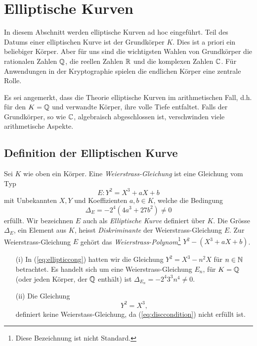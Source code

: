 \chapter{Elliptische Kurven}
\label{kap:ek}

In diesem Abschnitt werden elliptische Kurven ad hoc eingeführt.
Teil des Datums einer elliptischen Kurve ist der Grundkörper $K$. Dies
ist a priori ein beliebiger Körper. Aber für uns sind die wichtigsten
Wahlen von Grundkörper die rationalen Zahlen ${\mathbb{Q}}$, die reellen Zahlen
${\mathbb{R}}$ und die komplexen Zahlen ${\mathbb{C}}$. Für Anwendungen in der
Kryptographie spielen  die endlichen Körper eine zentrale Rolle.

Es sei angemerkt, dass die Theorie elliptische Kurven im
arithmetischen Fall, d.h. für den $K={\mathbb{Q}}$ und verwandte Körper, ihre
volle Tiefe entfaltet. Falls der Grundkörper, so wie ${\mathbb{C}}$,
algebraisch abgeschlossen ist, verschwinden viele arithmetische
Aspekte.

\section{Definition der Elliptischen Kurve}

\begin{definition}
  Sei $K$ wie oben ein Körper.
  Eine \emph{Weierstrass-Gleichung} ist eine Gleichung vom Typ
  \begin{equation}
    \label{eq:weierstrass}
    E: Y^2 = X^3 + aX + b
  \end{equation}
  mit Unbekannten $X,Y$ und Koeffizienten $a,b\in K$, welche die
  Bedingung
  \begin{equation}
    \label{eq:disccondition}
    \Delta_E = -2^4(4a^3+27b^2)\not=0
  \end{equation}
  erfüllt. Wir bezeichnen $E$ auch als \emph{Elliptische
    Kurve}
  definiert über $K$.
  Die Grösse $\Delta_E$, ein Element aus $K$, heisst
  \emph{Diskriminante}
  der Weierstrass-Gleichung $E$. Zur Weierstrass-Gleichung $E$ gehört
  das \emph{Weierstrass-Polynom}\footnote{Diese Bezeichnung ist nicht
    Standard.} $Y^2- (X^3+aX+b)$.
\end{definition}

\begin{beispiele}\leavevmode
  \begin{enumerate}
  \item [(i)] In (\ref{eq:ellipticcong}) hatten wir die Gleichung $Y^2 = X^3-n^2X$
    für $n\in{\mathbb{N}}$ betrachtet. Es handelt sich um eine
    Weierstrass-Gleichung $E_n$, für $K={\mathbb{Q}}$ (oder jeden Körper, der ${\mathbb{Q}}$
    enthält) ist $\Delta_{E_n} = -2^4 3^3 n^4 \not=0$.
  \item[(ii)] Die Gleichung
    \begin{equation*}
      Y^2 = X^3,
    \end{equation*}
    definiert keine Weierstass-Gleichung, da (\ref{eq:disccondition})
    nicht erfüllt ist.
  \end{enumerate}
\end{beispiele}

